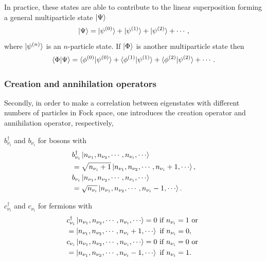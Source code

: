 \documentclass[a4paper,12pts]{article}
\numberwithin{equation}{section}
\begin{document}
	In practice, these states are able to contribute to the linear superposition forming a general multiparticle state $\ket{\Psi}$
	\begin{equation*}
	\ket{\Psi} = \ket{\psi^{(0)}} + \ket{\psi^{(1)}} + \ket{\psi^{(2)}} + \cdots,
	\end{equation*}
	where $\ket{\psi^{(n)}}$ is an $n$-particle state. If $\ket{\Phi}$ is another multiparticle state then
	\begin{equation*}
	\braket{\Phi|\Psi} = \braket{\phi^{(0)}|\psi^{(0)}} + \braket{\phi^{(1)}|\psi^{(1)}} + \braket{\phi^{(2)}|\psi^{(2)}} + \cdots .
	\end{equation*}
	\subsubsection{Creation and annihilation operators}
	Secondly, in order to make a correlation between eigenstates with different numbers of particles in Fock space, one introduces the creation operator and annihilation operator, respectively,
	\begin{center}
		\begin{minipage}{0.45\textwidth}
			$b^{\dagger}_{\nu_i}$ and $b_{\nu_i}$ for bosons with
			\begin{align}
			&b^{\dagger}_{\nu_i}\ket{n_{\nu_1}, n_{\nu_2},\cdots, n_{\nu_i},\cdots} \nonumber\\
			&= \sqrt{n_{\nu_i}+1}\ket{n_{\nu_1}, n_{\nu_2},\cdots, n_{\nu_i}+1,\cdots},\label{boson_creation} \\
			&b_{\nu_i}\ket{n_{\nu_1}, n_{\nu_2},\cdots, n_{\nu_i},\cdots} \nonumber\\
			&= \sqrt{n_{\nu_i}}\ket{n_{\nu_1}, n_{\nu_2},\cdots, n_{\nu_i}-1,\cdots}.\label{boson annihilation}
			\end{align}
		\end{minipage}
		\vrule{}
		\begin{minipage}{0.45\textwidth}
			$c^{\dagger}_{\nu_i}$ and $c_{\nu_i}$ for fermions with
			\begin{align}
			&c^{\dagger}_{\nu_i}\ket{n_{\nu_1}, n_{\nu_2},\cdots, n_{\nu_i},\cdots} = 0 \text{ if } n_{\nu_i} = 1  \text{ or }\nonumber\\
			&= \ket{n_{\nu_1}, n_{\nu_2},\cdots, n_{\nu_i}+1,\cdots}\text{ if } n_{\nu_i} = 0, \label{fermion_creation}\\
			&c_{\nu_i}\ket{n_{\nu_1}, n_{\nu_2},\cdots, n_{\nu_i},\cdots} = 0 \text{ if } n_{\nu_i} = 0 \text{ or }\nonumber\\
			&= \ket{n_{\nu_1}, n_{\nu_2},\cdots, n_{\nu_i}-1,\cdots}\text{ if } n_{\nu_i} = 1.\label{fermion annihilation}
			\end{align}
		\end{minipage}
	\end{center}
\end{document}
